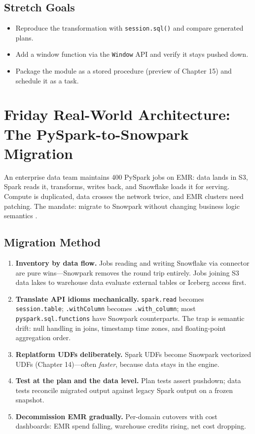 \subsection*{Stretch Goals}
\begin{itemize}
    \item Reproduce the transformation with \texttt{session.sql()} and compare generated plans.
    \item Add a window function via the \texttt{Window} API and verify it stays pushed down.
    \item Package the module as a stored procedure (preview of Chapter 15) and schedule it as a task.
\end{itemize}

\section{Friday Real-World Architecture: The PySpark-to-Snowpark Migration}
An enterprise data team maintains 400 PySpark jobs on EMR: data lands in S3, Spark reads it, transforms, writes back, and Snowflake loads it for serving. Compute is duplicated, data crosses the network twice, and EMR clusters need patching. The mandate: migrate to Snowpark without changing business logic semantics \cite{sparkDocs}.

\subsection{Migration Method}
\begin{enumerate}
    \item \textbf{Inventory by data flow.} Jobs reading and writing Snowflake via connector are pure wins---Snowpark removes the round trip entirely. Jobs joining S3 data lakes to warehouse data evaluate external tables or Iceberg access first.
    \item \textbf{Translate API idioms mechanically.} \texttt{spark.read} becomes \texttt{session.table}; \texttt{.withColumn} becomes \texttt{.with\_column}; most \texttt{pyspark.sql.functions} have Snowpark counterparts. The trap is semantic drift: null handling in joins, timestamp time zones, and floating-point aggregation order.
    \item \textbf{Replatform UDFs deliberately.} Spark UDFs become Snowpark vectorized UDFs (Chapter 14)---often \emph{faster}, because data stays in the engine.
    \item \textbf{Test at the plan and the data level.} Plan tests assert pushdown; data tests reconcile migrated output against legacy Spark output on a frozen snapshot.
    \item \textbf{Decommission EMR gradually.} Per-domain cutovers with cost dashboards: EMR spend falling, warehouse credits rising, net cost dropping.
\end{enumerate}

